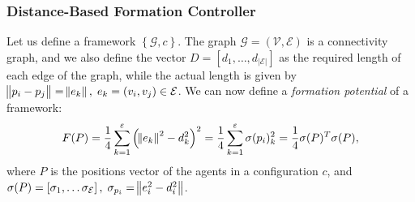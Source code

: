 \documentclass{iacas}
\newtheorem{definition}{Definition}
\begin{document}

\subsubsection{Distance-Based Formation Controller}
Let us define a framework $\left\{\mathcal{G}, c \right\}$. The graph $\mathcal{G} = (\mathcal{V}, \mathcal{E})$ is a connectivity graph, and we also define the vector $D = \left[d_1, \ldots, d_{|\mathcal{E}|}\right]$ as the required length of each edge of the graph, while the actual length is given by $\norm{p_i-p_j}=\norm{e_k},\; e_k =(v_i,v_j) \in \mathcal{E}$. We can now define a \emph{formation potential} of a framework:
\begin{equation}
F(P) = \frac{1}{4}\sum_{k=1}^{\varepsilon}\left( \norm{e_k}^2 - d_{k}^{2} \right)^2 = \frac{1}{4}\sum_{k=1}^{\varepsilon} \sigma(p_i)_k^2 = \frac{1}{4}\sigma(P)^T \sigma(P),
\label{eq:formation potential}
\end{equation}
where $P$ is the positions vector of the agents in a configuration $c$, and $\sigma(P) = \left[\sigma_1, \ldots \sigma_\mathcal{E} \right], \; \sigma_{p_i} = \norm{e_i^2 - d_{i}^{2}}$.
\end{document}

